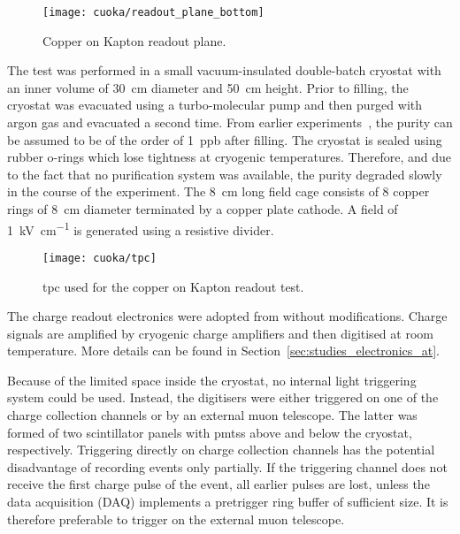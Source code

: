 \begin{figure}[htb]
	\centering
	\texttt{[image: cuoka/readout\_plane\_bottom]}
	\caption{Copper on Kapton readout plane.}
	\label{fig:cuoka_readout-plane}
\end{figure}

The test was performed in a small vacuum-insulated double-batch cryostat with an inner volume of \SI{30}{\centi\metre} diameter and \SI{50}{\centi\metre} height.
Prior to filling, the cryostat was evacuated using a turbo-molecular pump and then purged with argon gas and evacuated a second time.
From earlier experiments~\cite{2photonAbs}, the purity can be assumed to be of the order of \SI{1}{ppb} after filling.
The cryostat is sealed using rubber o-rings which lose tightness at cryogenic temperatures.
Therefore, and due to the fact that no purification system was available, the purity degraded slowly in the course of the experiment.
The \SI{8}{\centi\metre} long field cage consists of \num{8} copper rings of \SI{8}{\centi\metre} diameter terminated by a copper plate cathode.
A field of \SI{1}{\kilo\volt\per\centi\metre} is generated using a resistive divider.

\begin{figure}[htb]
	\centering
	\texttt{[image: cuoka/tpc]}
	\caption{\gls{tpc} used for the copper on Kapton readout test.}
	\label{fig:cuoka_tpc}
\end{figure}

The charge readout electronics were adopted from \AT{} without modifications.
Charge signals are amplified by cryogenic charge amplifiers and then digitised at room temperature.
More details can be found in Section~\ref{sec:studies_electronics_at}.

Because of the limited space inside the cryostat, no internal light triggering system could be used.
Instead, the digitisers were either triggered on one of the charge collection channels or by an external muon telescope.
The latter was formed of two scintillator panels with \glspl{pmt}s above and below the cryostat, respectively.
Triggering directly on charge collection channels has the potential disadvantage of recording events only partially.
If the triggering channel does not receive the first charge pulse of the event, all earlier pulses are lost, unless the data acquisition (DAQ) implements a pretrigger ring buffer of sufficient size.
It is therefore preferable to trigger on the external muon telescope.

